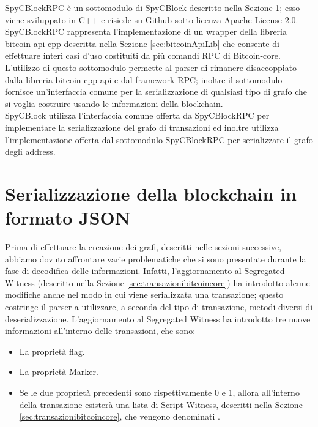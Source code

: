 SpyCBlockRPC è un sottomodulo di SpyCBlock descritto nella Sezione \ref{sec:spycblock}; esso viene sviluppato in C++ e risiede su Github sotto licenza Apache License 2.0.\\
SpyCBlockRPC rappresenta l'implementazione di un wrapper della libreria bitcoin-api-cpp descritta nella Sezione \ref{sec:bitcoinApiLib} che consente di effettuare interi casi d'uso costituiti da più comandi RPC di Bitcoin-core.
L'utilizzo di questo sottomodulo permette al parser di rimanere disaccoppiato dalla libreria bitcoin-cpp-api e dal framework RPC; inoltre il sottomodulo fornisce un'interfaccia comune per la serializzazione di qualsiasi tipo di grafo che si voglia costruire usando le informazioni della blockchain.\\
SpyCBlock utilizza l'interfaccia comune offerta da SpyCBlockRPC per implementare la serializzazione del grafo di transazioni ed inoltre utilizza l'implementazione offerta dal sottomodulo SpyCBlockRPC per serializzare il grafo degli address.

\section{Serializzazione della blockchain in formato JSON} \label{sec:spycblock}

Prima di effettuare la creazione dei grafi, descritti nelle sezioni successive, abbiamo dovuto affrontare varie problematiche che si sono presentate durante la fase di decodifica delle informazioni. Infatti, l'aggiornamento al Segregated Witness (descritto nella Sezione \ref{sec:transazionibitcoincore}) ha introdotto alcune modifiche anche nel modo in cui viene serializzata una transazione; questo costringe il parser a utilizzare, a seconda del tipo di transazione, metodi diversi di deserializzazione.
L'aggiornamento al Segregated Witness ha introdotto tre nuove informazioni all'interno delle transazioni, che sono:
\begin{itemize}
  \item La proprietà flag.
  \item La proprietà Marker.
  \item Se le due proprietà precedenti sono rispettivamente 0 e 1, allora all'interno della transazione esisterà una lista di Script Witness, descritti nella Sezione \ref{sec:transazionibitcoincore}, che vengono denominati .
\end{itemize}

